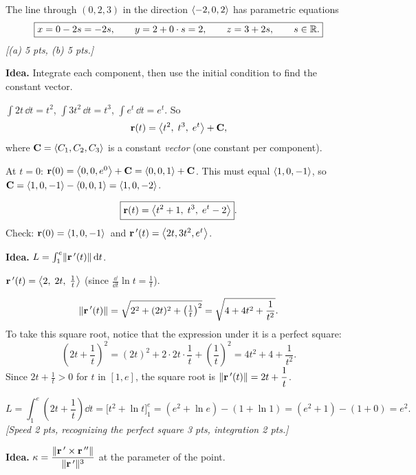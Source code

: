  The line through $(0,2,3)$ in the direction $\left\langle -2,0,2 \right\rangle$ has
parametric equations
\[
  \boxed{x=0-2s=-2s,\qquad y=2+0\cdot s=2,\qquad z=3+2s,\qquad s\in\mathbb{R} .}
\]
\textit{[(a) 5 pts, (b) 5 pts.]}

\textbf{Idea.} Integrate each component, then use the initial condition to find the
constant vector.

 $\int2t\,\dd t=t^2$, $\int3t^2\,\dd t=t^3$, $\int e^t\,\dd t=e^t$. So
\[
  \mathbf{r}(t)=\left\langle t^2,\;t^3,\;e^t \right\rangle+\mathbf{C},
\]
where $\mathbf{C}=\left\langle C_1,C_2,C_3 \right\rangle$ is a constant \emph{vector} (one constant per component).

 At $t=0$: $\mathbf{r}(0)=\left\langle 0,0,e^0 \right\rangle+\mathbf{C}=\left\langle 0,0,1 \right\rangle+\mathbf{C}$. This must equal
$\left\langle 1,0,-1 \right\rangle$, so $\mathbf{C}=\left\langle 1,0,-1 \right\rangle-\left\langle 0,0,1 \right\rangle=\left\langle 1,0,-2 \right\rangle$.

\[
  \boxed{\mathbf{r}(t)=\left\langle t^2+1,\;t^3,\;e^t-2 \right\rangle}.
\]
Check: $\mathbf{r}(0)=\left\langle 1,0,-1 \right\rangle$\checkok\ and $\mathbf{r}\,'(t)=\left\langle 2t,3t^2,e^t \right\rangle$\checkok.

\textbf{Idea.} $L=\int_1^e\lVert\mathbf{r}\,'(t)\rVert\,\mathrm{d} t$.

 $\mathbf{r}\,'(t)=\left\langle 2,\;2t,\;\frac1t \right\rangle$ (since $\frac{\dd}{\dd t}\ln t=\frac1t$).

\[
  \lVert\mathbf{r}\,'(t)\rVert=\sqrt{2^2+(2t)^2+\left(\tfrac1t\right)^2}=\sqrt{4+4t^2+\frac{1}{t^2}} .
\]
To take this square root, notice that the expression under it is a perfect square:
\[
  \left(2t+\frac1t\right)^2=(2t)^2+2\cdot2t\cdot\frac1t+\left(\frac1t\right)^2=4t^2+4+\frac{1}{t^2}.
\]
Since $2t+\frac1t>0$ for $t$ in $[1,e]$, the square root is $\lVert\mathbf{r}\,'(t)\rVert=2t+\dfrac1t$.

\[
  L=\int_1^e\left(2t+\frac1t\right)\dd t=\Big[t^2+\ln t\Big]_1^e=\left(e^2+\ln e\right)-\left(1+\ln1\right)
  =(e^2+1)-(1+0)=\boxed{e^2}.
\]
\textit{[Speed 2 pts, recognizing the perfect square 3 pts, integration 2 pts.]}


\textbf{Idea.} $\kappa=\dfrac{\lVert\mathbf{r}\,'\times\mathbf{r}\,''\rVert}{\lVert\mathbf{r}\,'\rVert^3}$ at the parameter of the point.

